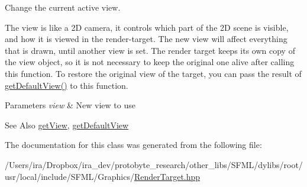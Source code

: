 Change the current active view. 

The view is like a 2\-D camera, it controls which part of the 2\-D scene is visible, and how it is viewed in the render-\/target. The new view will affect everything that is drawn, until another view is set. The render target keeps its own copy of the view object, so it is not necessary to keep the original one alive after calling this function. To restore the original view of the target, you can pass the result of \hyperlink{classsf_1_1_render_target_a718b1aa6296bf855171699cc18251ced}{get\-Default\-View()} to this function.


\begin{DoxyParams}{Parameters}
{\em view} & New view to use\\
\hline
\end{DoxyParams}
\begin{DoxySeeAlso}{See Also}
\hyperlink{classsf_1_1_render_target_a98f721cc6dc11478922427fedfb2288b}{get\-View}, \hyperlink{classsf_1_1_render_target_a718b1aa6296bf855171699cc18251ced}{get\-Default\-View} 
\end{DoxySeeAlso}


The documentation for this class was generated from the following file\-:\begin{DoxyCompactItemize}
\item 
/\-Users/ira/\-Dropbox/ira\-\_\-dev/protobyte\-\_\-research/other\-\_\-libs/\-S\-F\-M\-L/dylibs/root/usr/local/include/\-S\-F\-M\-L/\-Graphics/\hyperlink{_render_target_8hpp}{Render\-Target.\-hpp}\end{DoxyCompactItemize}
